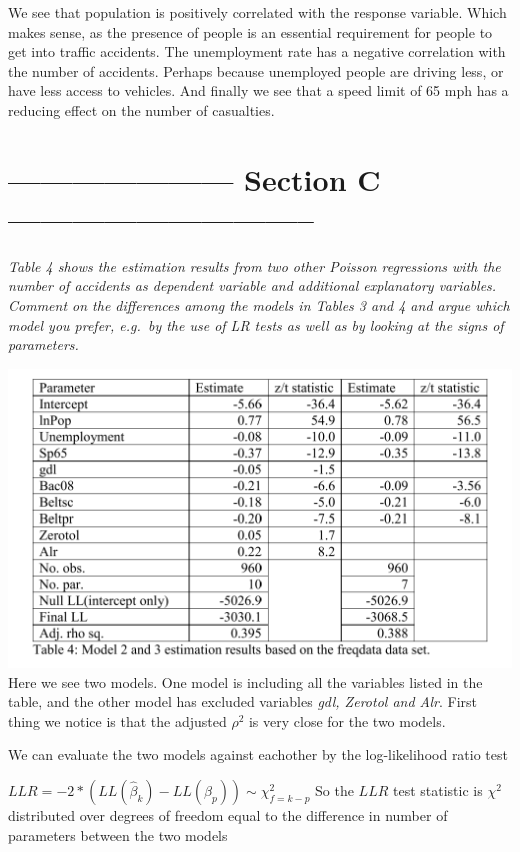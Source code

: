 \documentclass[
]{article}
\begin{document}
We see that population is positively correlated with the response
variable. Which makes sense, as the presence of people is an essential
requirement for people to get into traffic accidents. The unemployment
rate has a negative correlation with the number of accidents. Perhaps
because unemployed people are driving less, or have less access to
vehicles. And finally we see that a speed limit of 65 mph has a reducing
effect on the number of casualties.

\hypertarget{section-c}{%
\section{--------------------- Section C
-----------------------------}\label{section-c}}

\emph{Table 4 shows the estimation results from two other Poisson
regressions with the number of accidents as dependent variable and
additional explanatory variables. Comment on the differences among the
models in Tables 3 and 4 and argue which model you prefer, e.g.~by the
use of LR tests as well as by looking at the signs of parameters.}

\includegraphics{./images/model_2_and_3.png} Here we see two models. One
model is including all the variables listed in the table, and the other
model has excluded variables \emph{gdl, Zerotol and Alr}. First thing we
notice is that the adjusted \(\rho^2\) is very close for the two models.

We can evaluate the two models against eachother by the log-likelihood
ratio test

\(LLR = -2 * (LL(\hat{\beta}_k) - LL(\hat{\beta}_p))\sim \chi^2_{f=k-p}\)
So the \(LLR\) test statistic is \(\chi^2\) distributed over degrees of
freedom equal to the difference in number of parameters between the two
models
\end{document}
